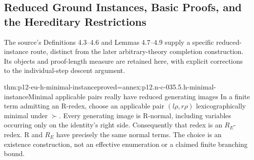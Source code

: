 \subsection{Reduced Ground Instances, Basic Proofs, and the Hereditary Restrictions}
\label{sec:p12-eu-hereditary-source}

The source's Definitions 4.3--4.6 and Lemmas 4.7--4.9 supply a
specific reduced-instance route, distinct from the later arbitrary-theory
completion construction. Its objects and proof-length measure are retained
here, with explicit corrections to the individual-step descent argument.
\cite[pp.~489--495]{BaaderSnyder2001}


\begin{hblemma}{thm:p12-eu-h-minimal-instance}{proved=annex:p12.n-c-035.5.h-minimal-instance}{Minimal applicable pairs really have reduced generating images}
In a finite term admitting an R-redex, choose an applicable pair
\((l\rho,r\rho)\) lexicographically minimal under \(\succ\).
Every generating image is R-normal, including variables occurring
only on the identity's right side. Consequently that redex is an
\(R_E\)-redex. R and \(R_E\) have precisely the same normal
terms. The choice is an existence construction, not an effective
enumeration or a claimed finite branching bound.
\end{hblemma}

